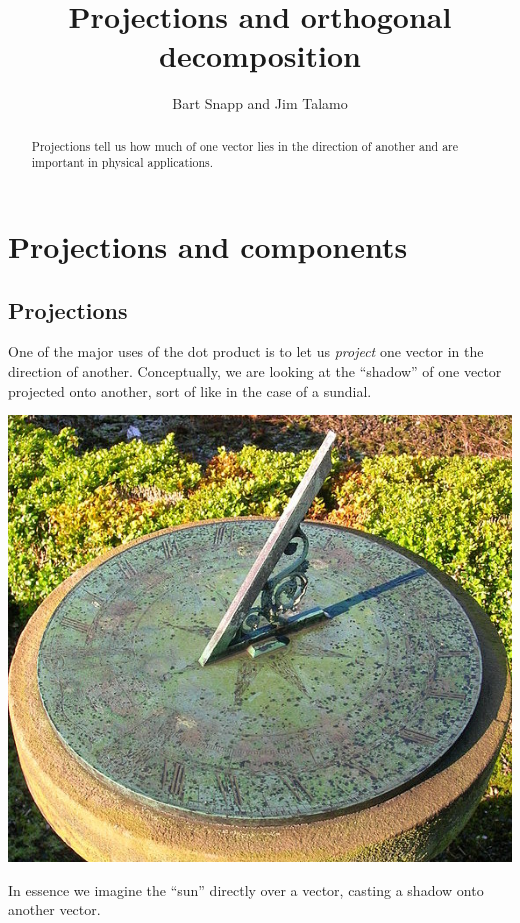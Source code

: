 \documentclass{ximera}
\author{Bart Snapp and Jim Talamo}
\title[Dig-In:]{Projections and orthogonal decomposition}
\begin{document}
\begin{abstract}
 Projections tell us how much of one vector lies in the direction of another and are important in physical applications.
\end{abstract}
\maketitle


\section{Projections and components}

\subsection{Projections}
One of the major uses of the dot product is to let us \textit{project}
one vector in the direction of another. Conceptually, we are looking
at the ``shadow'' of one vector projected onto another, sort of like
in the case of a sundial.
\begin{image}%
  \includegraphics{sundial.jpg}
\end{image}
In essence we imagine the ``sun'' directly over a vector, casting a shadow onto another vector.
\begin{image}
\end{image}
\end{document}
